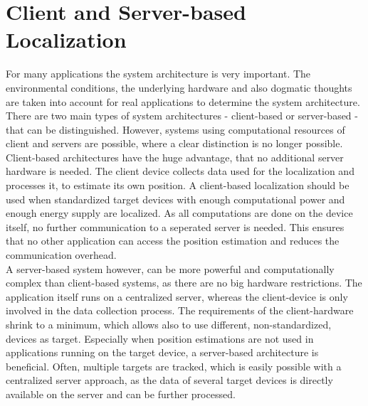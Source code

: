 \section{Client and Server-based Localization}
For many applications the system architecture is very important. The environmental conditions, the underlying hardware and also dogmatic thoughts are taken into account for real applications to determine the system architecture. There are two main types of system architectures - client-based or server-based - that can be distinguished. However, systems using computational resources of client and servers are possible, where a clear distinction is no longer possible.\\
\noindent\hspace*{5mm}%
Client-based architectures have the huge advantage, that no additional server hardware is needed. The client device collects data used for the localization and processes it, to estimate its own position. A client-based localization should be used when standardized target devices with enough computational power and enough energy supply are localized. As all computations are done on the device itself, no further communication to a seperated server is needed. This ensures that no other application can access the position estimation and reduces the communication overhead.\\
\noindent\hspace*{5mm}%
A server-based system however, can be more powerful and computationally complex than client-based systems, as there are no big hardware restrictions. The application itself runs on a centralized server, whereas the client-device is only involved in the data collection process. The requirements of the client-hardware shrink to a minimum, which allows also to use different, non-standardized, devices as target. Especially when position estimations are not used in applications running on the target device, a server-based architecture is beneficial. Often, multiple targets are tracked, which is easily possible with a centralized server approach, as the data of several target devices is directly available on the server and can be further processed. 


